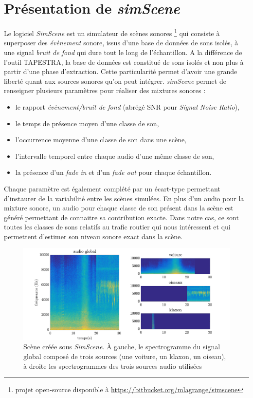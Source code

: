 \section{Présentation de \textit{simScene}}
Le logiciel \textit{SimScene} \cite{rossignol_simscene:_2015} est un simulateur de scènes sonores \footnote{projet open-source disponible à \url{https://bitbucket.org/mlagrange/simscene}} qui consiste à superposer des \textit{évènement} sonore, issus d'une base de données de sons isolés, à une signal \textit{bruit de fond} qui dure tout le long de l'échantillon. A la différence de l'outil TAPESTRA, la base de données est constitué de sons isolés et non plus à partir d'une phase d'extraction. Cette particularité permet d'avoir une grande liberté quant aux sources sonores qu'on peut intégrer. \textit{simScene} permet de renseigner plusieurs paramètres pour réaliser des mixtures sonores : 

\begin{itemize}
\item le rapport \textit{évènement/bruit de fond} (abrégé SNR pour \textit{Signal Noise Ratio}),
\item le temps de présence moyen d'une classe de son,
\item l'occurrence moyenne d'une classe de son dans une scène, 
\item l'intervalle temporel entre chaque audio d'une même classe de son,
\item la présence d'un \textit{fade in} et d'un \textit{fade out} pour chaque échantillon.\\
\end{itemize}

Chaque paramètre est également complété par un écart-type permettant d'instaurer de la variabilité entre les scènes simulées. En plus d'un audio pour la mixture sonore, un audio pour chaque classe de son présent dans la scène est généré permettant de connaitre sa contribution exacte. Dans notre cas, ce sont toutes les classes de sons relatifs au trafic routier qui nous intéressent et qui permettent d'estimer son niveau sonore exact dans la scène.\\

\begin{figure}[hbtp]
\centering
\includegraphics[width=.7\textwidth]{./figures/SimScene/exempleSimScene_spectrogramme_sourcesSonores.pdf}
\caption{Scène créée sous \textit{SimScene}. \`A gauche, le spectrogramme du signal global composé de trois sources (une voiture, un klaxon, un oiseau), à droite les spectrogrammes des trois sources audio utilisées}
\end{figure}


